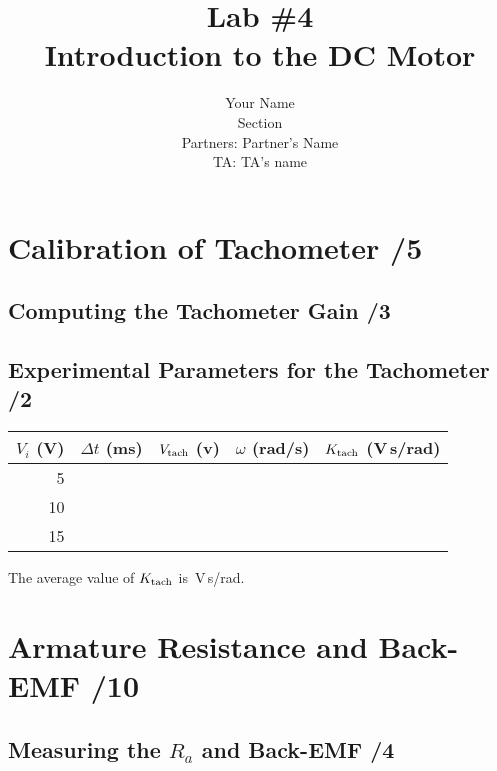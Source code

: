 \documentclass{article}
\title{Lab \#4\\{\sc Introduction to the DC Motor}}
\author{Your Name\\ Section\\
  Partners: Partner's Name\\
  TA: TA's name}
\newcommand{\score}{\hfill \underline{\hspace{1cm}}/}
\begin{document}
\maketitle
{}

\section{Calibration of Tachometer \score 5}
\subsection{Computing the Tachometer Gain \score 3}


\subsection{Experimental Parameters for the Tachometer \score 2}
\begin{center}
\begin{tabular}{rrrrr}
$V_i$ (V) & $\Delta t$ (ms) & $V_{\rm tach}$ (v) & $\omega$ (rad/s) & $K_{\rm tach}$ (V\,s/rad) \\
\hline
5  &  &  &   &  \\
10 &  &  &   &   \\
15 &  &  &   &  
\end{tabular}
\end{center}
The average value of $K_{\rm tach}$ is \,V\,s/rad.

\section{Armature Resistance and Back-EMF \score 10}
\subsection{Measuring the $R_a$ and Back-EMF \score 4}
 
\end{document}
